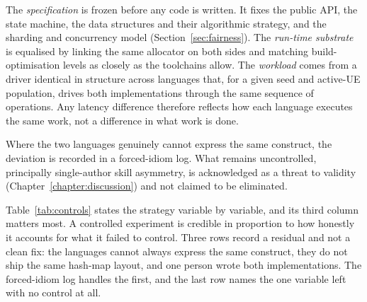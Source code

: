 \documentclass[english,oneside,a4paper,censored,csm,software-track-2020]{HYthesisML}
\begin{document}
The \emph{specification} is frozen before any code is written. It fixes the public API, the
state machine, the data structures and their algorithmic strategy, and the sharding and
concurrency model (Section~\ref{sec:fairness}). The \emph{run-time substrate} is equalised by
linking the
same allocator on both sides and matching build-optimisation levels as closely as the toolchains
allow. The \emph{workload} comes from a driver identical in structure across languages that, for
a given seed and active-UE population, drives both implementations through the same sequence of
operations. Any latency difference therefore reflects how each language executes the same work,
not a difference in what work is done.

Where the two languages genuinely cannot express the same construct, the deviation is recorded
in a forced-idiom log. What remains uncontrolled, principally single-author skill asymmetry, is
acknowledged as a threat to validity (Chapter~\ref{chapter:discussion}) and not claimed to be
eliminated.

Table~\ref{tab:controls} states the strategy variable by variable, and its third column matters
most. A controlled experiment is credible in proportion to how honestly it accounts for what it
failed to control. Three rows record a residual and not a clean fix: the languages cannot
always express the same construct, they do not ship the same hash-map layout, and one person
wrote both implementations. The forced-idiom log handles the first, and the last row names the
one variable left with no control at all.
\end{document}
